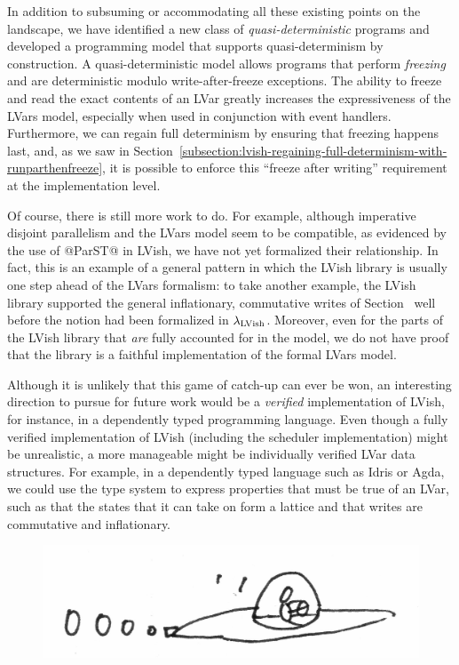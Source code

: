 In addition to subsuming or accommodating all these existing points on
the landscape, we have identified a new class of
\emph{quasi-deterministic} programs and developed a programming model
that supports quasi-determinism by construction.  A
quasi-deterministic model allows programs that perform \emph{freezing}
and are deterministic modulo write-after-freeze exceptions.  The
ability to freeze and read the exact contents of an LVar greatly
increases the expressiveness of the LVars model, especially when used
in conjunction with event handlers.  Furthermore, we can regain full
determinism by ensuring that freezing happens last, and, as we saw in
Section~\ref{subsection:lvish-regaining-full-determinism-with-runparthenfreeze},
it is possible to enforce this ``freeze after writing'' requirement at
the implementation level.

Of course, there is still more work to do.  For example, although
imperative disjoint parallelism and the LVars model seem to be
compatible, as evidenced by the use of @ParST@ in LVish, we have not
yet formalized their relationship.  In fact, this is an example of a
general pattern in which the LVish library is usually one step ahead
of the LVars formalism: to take another example, the LVish library
supported the general inflationary, commutative writes of
Section~\either{\ref{subsection:lvars-generalizing-from-least-upper-bound-writes}}{\ref{s:lvars-generalizing}}
well before the notion had been formalized in $\lambda_{\textrm{LVish}}$.
Moreover, even for the parts of the LVish library that \emph{are}
fully accounted for in the model, we do not have proof that the
library is a faithful implementation of the formal LVars model.

Although it is unlikely that this game of catch-up can ever be won, an
interesting direction to pursue for future work would be a
\emph{verified} implementation of LVish, for instance, in a
dependently typed programming language.  Even though a fully verified
implementation of LVish (including the scheduler implementation) might
be unrealistic, a more manageable might be individually verified
LVar data structures.  For example, in a dependently typed language
such as Idris or Agda, we could use the type system to express
properties that must be true of an LVar, such as that the states that
it can take on form a lattice and that writes are commutative and
inflationary.

\ifdefined\DISSERTATION
\begin{figure}[h]
  \vspace{-1em}
  \begin{center}
    \includegraphics[scale=0.15]{../illustrations/flying-saucer}
  \end{center}
  \vspace{-1em}
\end{figure}
\fi

